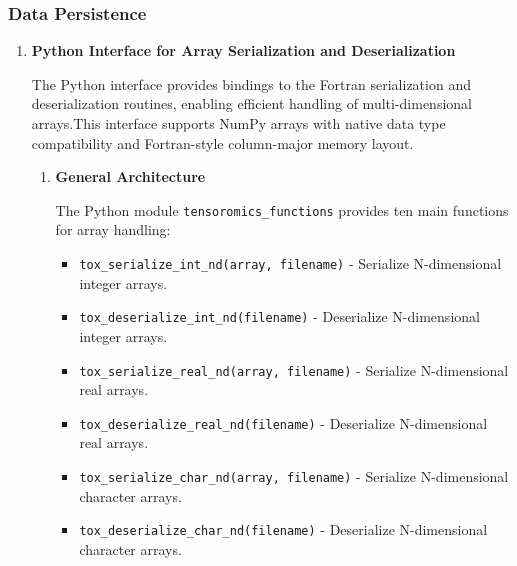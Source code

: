 \subsubsection{Data Persistence}
\begin{enumerate}
    \item \textbf{Python Interface for Array Serialization and Deserialization}
          
          The Python interface provides bindings to the Fortran serialization and deserialization
          routines, enabling efficient handling of multi-dimensional arrays.This
          interface supports NumPy arrays with native data type compatibility and
          Fortran-style column-major memory layout.
          \begin{enumerate}
            \item \textbf{General Architecture}
                  
                  The Python module \texttt{tensoromics\_functions} provides ten main
                  functions for array handling:
                  
                  \begin{itemize}
                    \item \texttt{tox\_serialize\_int\_nd(array, filename)} - Serialize
                          N-dimensional integer arrays.
                          
                    \item \texttt{tox\_deserialize\_int\_nd(filename)} - Deserialize N-dimensional
                          integer arrays.
                          
                    \item \texttt{tox\_serialize\_real\_nd(array, filename)} - Serialize
                          N-dimensional real arrays.
                          
                    \item \texttt{tox\_deserialize\_real\_nd(filename)} - Deserialize N-dimensional
                          real arrays.
                          
                    \item \texttt{tox\_serialize\_char\_nd(array, filename)} - Serialize
                          N-dimensional character arrays.
                          
                    \item \texttt{tox\_deserialize\_char\_nd(filename)} - Deserialize N-dimensional
                          character arrays.
                          

\end{itemize}
\end{enumerate}
\end{enumerate}
